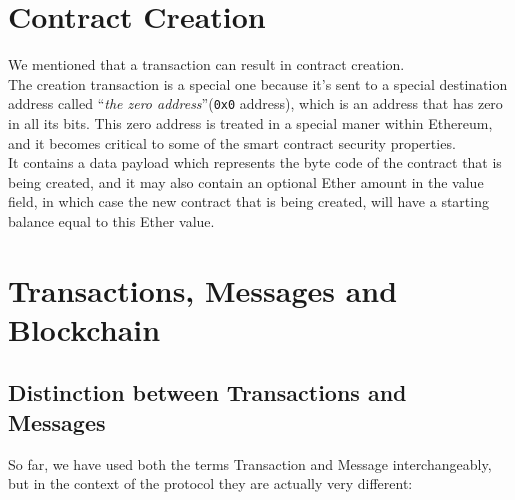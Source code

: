 \section{Contract Creation}

We mentioned that a transaction can result in contract creation.\\

The creation transaction is a special one because it's sent to a special destination address called ``\textit{the zero address}''(\texttt{0x0} address), which is an address that has zero in all its bits.
This zero address is treated in a special maner within Ethereum, and it becomes critical to some of the smart contract security properties.\\

It contains a data payload which represents the byte code of the contract that is being created, and it may also contain an optional Ether amount in the value field, in which case the new contract that is being created, will have a starting balance equal to this Ether value.

\section{Transactions, Messages and Blockchain}

\subsection*{Distinction between Transactions and Messages}

So far, we have used both the terms Transaction and Message interchangeably, but in the context of the protocol they are actually very different:


